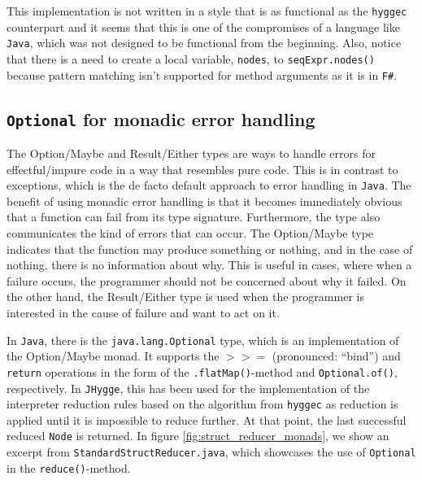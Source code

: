 This implementation is not written in a style that is as functional as the \texttt{hyggec} counterpart and it seems that
this is one of the compromises of a language like \texttt{Java}, which was not designed to be functional from the beginning.
Also, notice that there is a need to create a local variable, \texttt{nodes}, to \texttt{seqExpr.nodes()} because pattern
matching isn't supported for method arguments as it is in \texttt{F\#}.

\subsection{\texttt{Optional} for monadic error handling}

The Option/Maybe and Result/Either types are ways to handle errors for effectful/impure code in a way that resembles pure code.
This is in contrast to exceptions, which is the de facto default approach to error handling in \texttt{Java}. The benefit
of using monadic error handling is that it becomes immediately obvious that a function can fail from its type signature.
Furthermore, the type also communicates the kind of errors that can occur. The Option/Maybe type indicates that the function
may produce something or nothing, and in the case of nothing, there is no information about why. This is useful in cases,
where when a failure occurs, the programmer should not be concerned about why it failed. On the other hand, the Result/Either
type is used when the programmer is interested in the cause of failure and want to act on it.

In \texttt{Java}, there is the \texttt{java.lang.Optional} type, which is an implementation of the Option/Maybe monad. It
supports the $>>=$ (pronounced: ``bind'') and \texttt{return} operations in the form of the \texttt{.flatMap()}-method
and \texttt{Optional.of()}, respectively. In \texttt{JHygge}, this has been used for the implementation of the interpreter
reduction rules based on the algorithm from \texttt{hyggec} as reduction is applied until it is impossible to reduce further.
At that point, the last successful reduced \texttt{Node} is returned. In figure \ref{fig:struct_reducer_monads}, we show an excerpt from
\texttt{StandardStructReducer.java}, which showcases the use of \texttt{Optional} in the \texttt{reduce()}-method.

